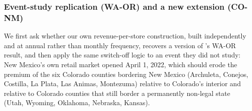 ﻿\documentclass{article}
\begin{document}
\subsubsection{Event-study replication (WA-OR) and a new extension (CO-NM)}

We first ask whether our own revenue-per-store construction, built independently and at annual rather than
monthly frequency, recovers a version of \citeauthor{HansenMillerWeber2020}'s WA-OR result, and then apply
the same switch-off logic to an event they did not study: New Mexico's own retail market opened April 1,
2022, which should erode the premium of the six Colorado counties bordering New Mexico (Archuleta, Conejos,
Costilla, La Plata, Las Animas, Montezuma) relative to Colorado's interior and relative to Colorado counties
that still border a permanently non-legal state (Utah, Wyoming, Oklahoma, Nebraska, Kansas).


\end{document}
